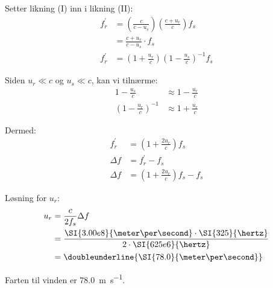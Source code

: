 \documentclass[answers,a4paper,12pt]{exam}
\begin{document}
\begin{questions}
\begin{parts}
\begin{solution}
Setter likning (I) inn i likning (II):
\begin{align}
f_{r}^{\prime} &= \left(\frac{c}{c-u_{s}}\right)\left(\frac{c+u_{r}}{c}\right) f_{s} \\
&= \frac{c+u_{r}}{c-u_{s}} \cdot f_{s} \\
f_{r}^{\prime} &= \left(1+\frac{u_{r}}{c}\right)\left(1-\frac{u_{s}}{c}\right)^{-1} f_{s}
\end{align}

Siden $u_{r} \ll c$ og $u_{s} \ll c$, kan vi tilnærme:
\begin{align}
1-\frac{u_{s}}{c} &\approx 1-\frac{u_{r}}{c} \\
\left(1-\frac{u_{r}}{c}\right)^{-1} &\approx 1+\frac{u_{r}}{c}
\end{align}

Dermed:
\begin{align}
f_{r}^{\prime} &= \left(1+\frac{2 u_{r}}{c}\right) f_{s} \\
\Delta f &= f_{r}^{\prime} - f_{s} \\
\Delta f &= \left(1+\frac{2 u_{r}}{c}\right) f_{s} - f_{s}
\end{align}

Løsning for $u_{r}$:
\begin{align}
u_{r} &= \frac{c}{2 f_{s}} \Delta f \\
&= \frac{\SI{3.00e8}{\meter\per\second} \cdot \SI{325}{\hertz}}{2 \cdot \SI{625e6}{\hertz}} \\
&= \doubleunderline{\SI{78.0}{\meter\per\second}}
\end{align}

Farten til vinden er \SI{78.0}{\meter\per\second}.
\end{solution}
\end{parts}

\end{questions}
\end{document}
